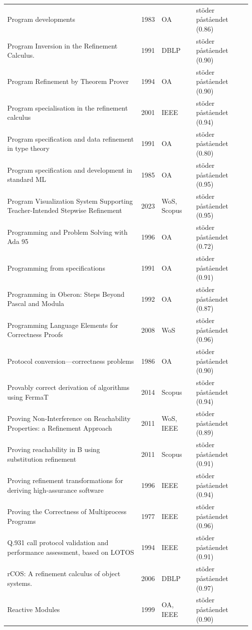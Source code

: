 \begin{longtable}{@{}%
  >{\raggedright\arraybackslash}p{}c%
  >{\raggedright\arraybackslash}p{}%
  >{\raggedright\arraybackslash}p{}@{}}
Program developments & 1983 & OA & stöder påståendet (0.86) \\
Program Inversion in the Refinement Calculus. & 1991 & DBLP & stöder påståendet (0.90) \\
Program Refinement by Theorem Prover & 1994 & OA & stöder påståendet (0.90) \\
Program specialisation in the refinement calculus & 2001 & IEEE & stöder påståendet (0.94) \\
Program specification and data refinement in type theory & 1991 & OA & stöder påståendet (0.80) \\
Program specification and development in standard ML & 1985 & OA & stöder påståendet (0.95) \\
Program Visualization System Supporting Teacher-Intended Stepwise Refinement & 2023 & WoS, Scopus & stöder påståendet (0.95) \\
Programming and Problem Solving with Ada 95 & 1996 & OA & stöder påståendet (0.72) \\
Programming from specifications & 1991 & OA & stöder påståendet (0.91) \\
Programming in Oberon: Steps Beyond Pascal and Modula & 1992 & OA & stöder påståendet (0.87) \\
Programming Language Elements for Correctness Proofs & 2008 & WoS & stöder påståendet (0.96) \\
Protocol conversion---correctness problems & 1986 & OA & stöder påståendet (0.90) \\
Provably correct derivation of algorithms using FermaT & 2014 & Scopus & stöder påståendet (0.94) \\
Proving Non-Interference on Reachability Properties: a Refinement Approach & 2011 & WoS, IEEE & stöder påståendet (0.89) \\
Proving reachability in B using substitution refinement & 2011 & Scopus & stöder påståendet (0.91) \\
Proving refinement transformations for deriving high-assurance software & 1996 & IEEE & stöder påståendet (0.94) \\
Proving the Correctness of Multiprocess Programs & 1977 & IEEE & stöder påståendet (0.96) \\
Q.931 call protocol validation and performance assessment, based on LOTOS & 1994 & IEEE & stöder påståendet (0.91) \\
rCOS: A refinement calculus of object systems. & 2006 & DBLP & stöder påståendet (0.97) \\
Reactive Modules & 1999 & OA, IEEE & stöder påståendet (0.90) \\

\end{longtable}
